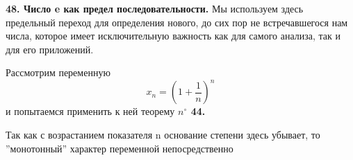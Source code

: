 \documentclass[a5paper, 10pt]{book}
\author{Руслан Шамбилов}
\date{26.02.2023}
\begin{document}
    \begin{center}
    \end{center}
    \par \textbf{48. Число e как предел последовательности.} Мы используем здесь предельный переход для определения нового, до сих пор не встречавшегося нам числа, которое имеет исключительную важность как для самого анализа, так и для его приложений.
    \par Рассмотрим переменную 
    \[x_n = (1 + \frac{1}{n})^n\]
    и попытаемся применить к ней теорему \textbf{$n^{\circ}$ 44.}
    \par Так как с возрастанием показателя n основание степени здесь убывает, то ''монотонный'' характер переменной непосредственно 

    \newpage

    \begin{center}
    \end{center}
    
\end{document}

